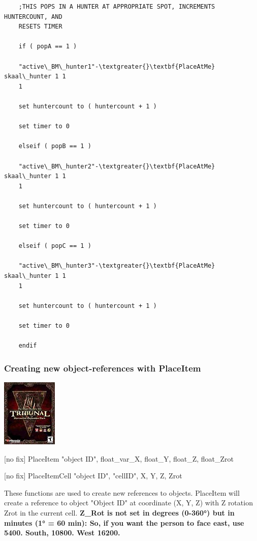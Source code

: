 \begin{lstlisting}
	;THIS POPS IN A HUNTER AT APPROPRIATE SPOT, INCREMENTS HUNTERCOUNT, AND
	RESETS TIMER
	
	if ( popA == 1 )
	
	"active\_BM\_hunter1"-\textgreater{}\textbf{PlaceAtMe} skaal\_hunter 1 1
	1
	
	set huntercount to ( huntercount + 1 )
	
	set timer to 0
	
	elseif ( popB == 1 )
	
	"active\_BM\_hunter2"-\textgreater{}\textbf{PlaceAtMe} skaal\_hunter 1 1
	1
	
	set huntercount to ( huntercount + 1 )
	
	set timer to 0
	
	elseif ( popC == 1 )
	
	"active\_BM\_hunter3"-\textgreater{}\textbf{PlaceAtMe} skaal\_hunter 1 1
	1
	
	set huntercount to ( huntercount + 1 )
	
	set timer to 0
	
	endif
\end{lstlisting}

\hypertarget{creating-new-object-references-with-placeitem}{%
\subsubsection{Creating new object-references with
PlaceItem}\label{creating-new-object-references-with-placeitem}}

\includegraphics{media/image6.png}

{[}no fix{]} PlaceItem "object ID", float\_var\_X, float\_Y, float\_Z,
float\_Zrot

{[}no fix{]} PlaceItemCell "object ID", "cellID", X, Y, Z, Zrot


These functions are used to create new references to objects. PlaceItem
will create a reference to object "Object ID" at coordinate (X, Y, Z)
with Z rotation Zrot in the current cell. \textbf{Z\_Rot is not set in
degrees (0-360°) but in minutes (1° = 60 min): So, if you want the
person to face east, use 5400. South, 10800. West 16200.}

